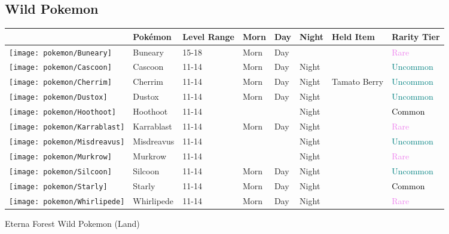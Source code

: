 \subsection{Wild Pokemon}%
\label{subsec:WildPokemon}%
\begin{longtable}{||l l l l l l l l||}%
\hline%
&Pokémon&Level Range&Morn&Day&Night&Held Item&Rarity Tier\\%
\hline%
\endhead%
\hline%
\texttt{[image: pokemon/Buneary]}&Buneary&15{-}18&Morn&Day&&&\textcolor{violet}{%
Rare%
}\\%
\hline%
\texttt{[image: pokemon/Cascoon]}&Cascoon&11{-}14&Morn&Day&Night&&\textcolor{teal}{%
Uncommon%
}\\%
\hline%
\texttt{[image: pokemon/Cherrim]}&Cherrim&11{-}14&Morn&Day&Night&Tamato Berry&\textcolor{teal}{%
Uncommon%
}\\%
\hline%
\texttt{[image: pokemon/Dustox]}&Dustox&11{-}14&Morn&Day&Night&&\textcolor{teal}{%
Uncommon%
}\\%
\hline%
\texttt{[image: pokemon/Hoothoot]}&Hoothoot&11{-}14&&&Night&&\textcolor{black}{%
Common%
}\\%
\hline%
\texttt{[image: pokemon/Karrablast]}&Karrablast&11{-}14&Morn&Day&Night&&\textcolor{violet}{%
Rare%
}\\%
\hline%
\texttt{[image: pokemon/Misdreavus]}&Misdreavus&11{-}14&&&Night&&\textcolor{teal}{%
Uncommon%
}\\%
\hline%
\texttt{[image: pokemon/Murkrow]}&Murkrow&11{-}14&&&Night&&\textcolor{violet}{%
Rare%
}\\%
\hline%
\texttt{[image: pokemon/Silcoon]}&Silcoon&11{-}14&Morn&Day&Night&&\textcolor{teal}{%
Uncommon%
}\\%
\hline%
\texttt{[image: pokemon/Starly]}&Starly&11{-}14&Morn&Day&Night&&\textcolor{black}{%
Common%
}\\%
\hline%
\texttt{[image: pokemon/Whirlipede]}&Whirlipede&11{-}14&Morn&Day&Night&&\textcolor{violet}{%
Rare%
}\\%
\hline%
\end{longtable}%
\caption{Eterna Forest Wild Pokemon (Land)}